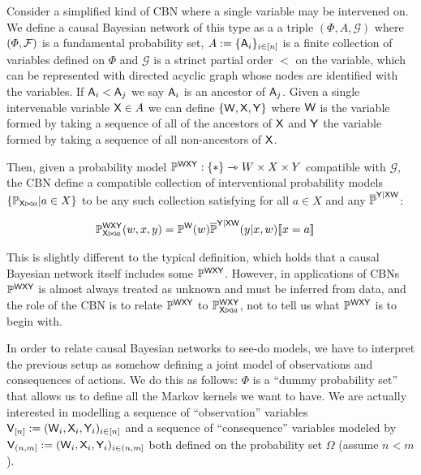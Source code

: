 Consider a simplified kind of CBN where a single variable may be intervened on. We define a causal Bayesian network of this type as a a triple $(\Phi,A,\mathcal{G})$ where $(\Phi,\mathcal{F})$ is a fundamental probability set, $A:=\{\mathsf{A}_i\}_{i\in [n]}$ is a finite collection of variables defined on $\Phi$ and $\mathcal{G}$ is a strinct partial order $<$ on the variable, which can be represented with directed acyclic graph whose nodes are identified with the variables. If $\mathsf{A}_i<\mathsf{A}_j$ we say $\mathsf{A}_i$ is an ancestor of $\mathsf{A}_j$. Given a single intervenable variable $\mathsf{X}\in A$ we can define $\{\mathsf{W},\mathsf{X},\mathsf{Y}\}$ where $\mathsf{W}$ is the variable formed by taking a sequence of all of the ancestors of $\mathsf{X}$ and $\mathsf{Y}$ the variable formed by taking a sequence of all non-ancestors of $\mathsf{X}$.

Then, given a probability model $\mathbb{P}^{\mathsf{WXY}}:\{*\}\rightarrowtriangle W\times X\times Y$ compatible with $\mathcal{G}$, the CBN define a compatible collection of interventional probability models $\{\mathbb{P}_{\mathsf{X}\bowtie a}|a\in X\}$ to be any such collection satisfying for all $a\in X$ and any $\overline{\mathbb{P}}^{\mathsf{Y}|\mathsf{XW}}$:

\begin{align}
    \mathbb{P}_{\mathsf{X}\bowtie a}^{\mathsf{W}\mathsf{X}\mathsf{Y}}(w,x,y) &= \mathbb{P}^{\mathsf{W}}(w)\overline{\mathbb{P}}^{\mathsf{Y}|\mathsf{XW}}(y|x,w)\llbracket x=a \rrbracket\label{eq:truncated_fac2}
\end{align}

This is slightly different to the typical definition, which holds that a causal Bayesian network itself includes some $\mathbb{P}^{\mathsf{WXY}}$. However, in applications of CBNs $\mathbb{P}^{\mathsf{WXY}}$ is almost always treated as unknown and must be inferred from data, and the role of the CBN is to relate $\mathbb{P}^{\mathsf{WXY}}$ to $\mathbb{P}_{\mathsf{X}\bowtie a}^{\mathsf{W}\mathsf{X}\mathsf{Y}}$, not to tell us what $\mathbb{P}^{\mathsf{WXY}}$ is to begin with.

In order to relate causal Bayesian networks to see-do models, we have to interpret the previous setup as somehow defining a joint model of observations and consequences of actions. We do this as follows: $\Phi$ is a ``dummy probability set'' that allows us to define all the Markov kernels we want to have. We are actually interested in modelling a sequence of ``observation'' variables $\mathsf{V}_{[n]}:=(\mathsf{W}_i,\mathsf{X}_i,\mathsf{Y}_i)_{i\in [n]}$ and a sequence of ``consequence'' variables modeled by $\mathsf{V}_{(n,m]}:=(\mathsf{W}_i,\mathsf{X}_i,\mathsf{Y}_i)_{i\in (n,m]}$ both defined on the probability set $\Omega$ (assume $n<m$).

